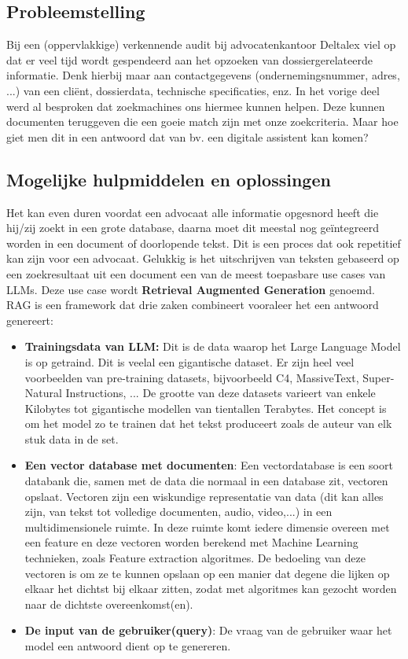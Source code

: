 \subsection{Probleemstelling}
Bij een (oppervlakkige) verkennende audit bij advocatenkantoor Deltalex viel op dat er veel tijd wordt gespendeerd aan het opzoeken van dossiergerelateerde informatie.
Denk hierbij maar aan contactgegevens (ondernemingsnummer, adres, ...) van een cliënt, dossierdata, technische specificaties, enz.
In het vorige deel werd al besproken dat zoekmachines ons hiermee kunnen helpen. Deze kunnen documenten teruggeven die een goeie match zijn met onze zoekcriteria.
Maar hoe giet men dit in een antwoord dat van bv. een digitale assistent kan komen?

\subsection{Mogelijke hulpmiddelen en oplossingen}
Het kan even duren voordat een advocaat alle informatie opgesnord heeft die hij/zij zoekt in een grote database, daarna moet dit meestal nog geïntegreerd worden in een document of doorlopende tekst.
Dit is een proces dat ook repetitief kan zijn voor een advocaat.
Gelukkig is het uitschrijven van teksten gebaseerd op een zoekresultaat uit een document een van de meest toepasbare \autocite{MediumRAG} use cases van \Gls{LLM}s.
Deze use case wordt \textbf{Retrieval Augmented Generation} genoemd.\\

RAG is een \Gls{framework} dat drie zaken combineert vooraleer het een antwoord genereert:
\begin{itemize}
	\item \textbf{Trainingsdata van \Gls{LLM}:}
	      Dit is de data waarop het Large Language Model is op getraind. Dit is veelal een gigantische dataset.
	      Er zijn heel veel voorbeelden van pre-training datasets, bijvoorbeeld C4, MassiveText,  Super-Natural Instructions, ... \autocite{ACOoLLM}
	      De grootte van deze datasets varieert van enkele Kilobytes tot gigantische modellen van tientallen Terabytes. \autocite{ACOoLLM}
	      Het concept is om het model zo te trainen dat het tekst produceert zoals de auteur van elk stuk data in de set.
	\item \textbf{Een vector database met documenten}:
	      Een vectordatabase is een soort databank die, samen met de data die normaal in een database zit, vectoren opslaat.
	      Vectoren zijn een wiskundige representatie van data (dit kan alles zijn, van tekst tot volledige documenten, audio, video,...) in een multidimensionele ruimte.
	      In deze ruimte komt iedere dimensie overeen met een \Gls{feature} en deze vectoren worden berekend met \Gls{Machine Learning} technieken, zoals \Gls{Feature extraction} algoritmes.
	      De bedoeling van deze vectoren is om ze te kunnen opslaan op een manier dat degene die lijken op elkaar het dichtst bij elkaar zitten, zodat met algoritmes kan gezocht worden naar de dichtste overeenkomst(en).
	\item \textbf{De input van de gebruiker(query)}: De vraag van de gebruiker waar het model een antwoord dient op te genereren.
\end{itemize}
\newpage

